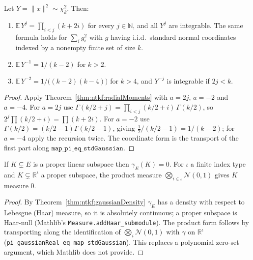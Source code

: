 \begin{corollary}\label{cor:ntkf:chiSquare}
  \leanok
Let $Y=\|x\|^2\sim\chi^2_k$. Then:
\begin{enumerate}
  \item $\mathbb E\,Y^j=\prod_{i<j}(k+2i)$ for every $j\in\mathbb N$, and all $Y^j$ are integrable. The same formula holds for
  $\sum_ig_i^2$ with $g$ having i.i.d.\ standard normal coordinates indexed by a nonempty finite set of size $k$.
  \item $\mathbb E\,Y^{-1}=1/(k-2)$ for $k>2$.
  \item $\mathbb E\,Y^{-2}=1/\bigl((k-2)(k-4)\bigr)$ for $k>4$, and $Y^{-j}$ is integrable if $2j<k$.
\end{enumerate}
\end{corollary}

\begin{proof}
  \leanok
Apply Theorem~\ref{thm:ntkf:radialMoments} with $a=2j$, $a=-2$ and $a=-4$. For $a=2j$ use $\Gamma(k/2+j)=\prod_{i<j}(k/2+i)\,\Gamma(k/2)$,
so $2^j\prod(k/2+i)=\prod(k+2i)$. For $a=-2$ use $\Gamma(k/2)=(k/2-1)\Gamma(k/2-1)$, giving $\tfrac12/(k/2-1)=1/(k-2)$; for $a=-4$
apply the recursion twice. The coordinate form is the transport of the first part along $\texttt{map\_pi\_eq\_stdGaussian}$.
\end{proof}


\begin{theorem}\label{thm:ntkf:subspaceNull}
  \leanok
If $K\subsetneq E$ is a proper linear subspace then $\gamma_E(K)=0$. For $\iota$ a finite index type and $K\subsetneq\mathbb R^\iota$ a proper subspace, the product measure $\bigotimes_{i\in\iota}\mathcal N(0,1)$ gives $K$ measure $0$.
\end{theorem}

\begin{proof}
  \leanok
By Theorem~\ref{thm:ntkf:gaussianDensity} $\gamma_E$ has a density with respect to Lebesgue (Haar) measure, so it is absolutely continuous; a proper subspace is Haar-null (Mathlib's \texttt{Measure.addHaar\_submodule}). The product form follows by
transporting along the identification of $\bigotimes_i\mathcal N(0,1)$ with $\gamma$ on $\mathbb R^\iota$ (\texttt{pi\_gaussianReal\_eq\_map\_stdGaussian}). This replaces a polynomial zero-set argument, which Mathlib does not provide.
\end{proof}

